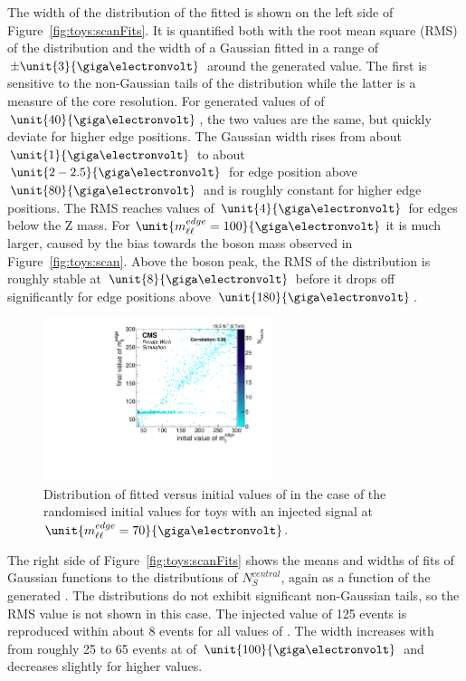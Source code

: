 The width of the distribution of the fitted \mlledge is shown on the left side of Figure~\ref{fig:toys:scanFits}. It is quantified both with the root mean square (RMS) of the distribution and the width of a Gaussian fitted in a range of $\pm\unit{3}{\giga\electronvolt}$ around the generated value. The first is sensitive to the non-Gaussian tails of the distribution while the latter is a measure of the core resolution. For generated values of \mlledge of $\unit{40}{\giga\electronvolt}$, the two values are the same, but quickly deviate for higher edge positions. The Gaussian width rises from about $\unit{1}{\giga\electronvolt}$ to about $\unit{2-2.5}{\giga\electronvolt}$ for edge position above $\unit{80}{\giga\electronvolt}$ and is roughly constant for higher edge positions. The RMS reaches values of $\unit{4}{\giga\electronvolt}$ for edges below the Z mass. For $\unit{\mlledge=100}{\giga\electronvolt}$ it is much larger, caused by the bias towards the \Z boson mass observed in Figure~\ref{fig:toys:scan}. Above the \Z boson peak, the RMS of the distribution is roughly stable at $\unit{8}{\giga\electronvolt}$ before it drops off significantly for edge positions above $\unit{180}{\giga\electronvolt}$.


\begin{figure}[hbp]
  \centering

    \includegraphics[width=0.6\textwidth]{plots/results/fit/toyResults/fittedM0vsinitialM0_signalInjectedM70N125_NegSig.pdf}
  \caption{Distribution of fitted versus initial values of \mlledge in the case of the randomised initial values for toys with an injected signal at $\unit{\mlledge = 70}{\giga\electronvolt}$.}
  \label{fig:toys:randM0Signal}
\end{figure}



The right side of Figure~\ref{fig:toys:scanFits} shows the means and widths of fits of Gaussian functions to the distributions of $N_{S}^{central}$, again as a function of the generated \mlledge. The distributions do not exhibit significant non-Gaussian tails, so the RMS value is not shown in this case. The injected value of 125 events is reproduced within about 8 events for all values of \mlledge. The width increases with \mlledge from roughly 25 to 65 events at \mlledge of $\unit{100}{\giga\electronvolt}$ and decreases slightly for higher values.


